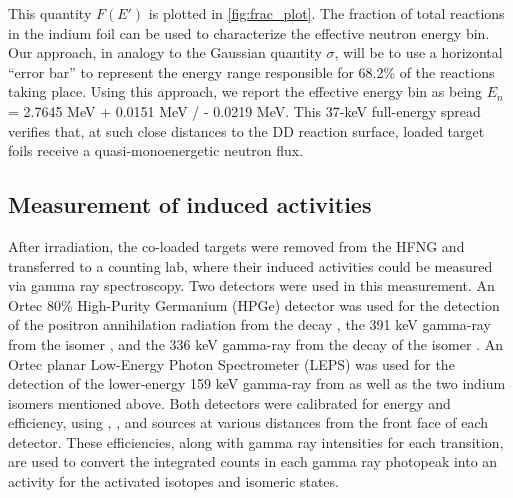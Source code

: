 \documentclass[5p]{elsarticle}
\newcommand{\pp}[1]{\left( #1\right)}
\newcommand{\comment}[1]{\todo[color=blue!20!white,inline]{ASV: #1}}
\begin{document}


This quantity $F\pp{E'}$ is plotted in \autoref{fig:frac_plot}. The fraction of total reactions in the indium foil can be used to characterize the effective neutron energy bin.  Our approach, in analogy to the Gaussian quantity $\sigma$, will be to use a horizontal \enquote{error bar}  to represent the energy range responsible for 68.2\% of the reactions taking place.  Using this approach, we report the effective energy bin as being $E_n$ = 2.7645 MeV + 0.0151 MeV / - 0.0219 MeV.  This 37-keV full-energy spread verifies that, at such close distances to the DD reaction surface, loaded target foils receive a quasi-monoenergetic neutron flux.









\subsection{Measurement of induced activities}\label{sec:spectroscopy}

After irradiation, the co-loaded targets were removed from the HFNG and transferred to a counting lab, where their induced activities could be measured via gamma ray spectroscopy. Two detectors were used in this measurement. An Ortec 80\% High-Purity Germanium (HPGe) detector was used for the detection of the positron annihilation radiation from the   decay \cite{Singh2007}, the 391 keV gamma-ray from the   isomer \cite{Blachot2010a}, and the 336 keV gamma-ray from the decay of the   isomer \cite{Blachot2012}. An Ortec planar Low-Energy Photon Spectrometer (LEPS)  was used for the detection of the lower-energy 159 keV gamma-ray from  \cite{Burrows2007} as well as the two indium isomers mentioned above. Both detectors were calibrated for energy and efficiency, using , , and  sources at various distances from the front face of each detector. These efficiencies, along with gamma ray intensities for each transition, are used to convert the integrated counts in each gamma ray photopeak into an activity for the activated isotopes and isomeric states. 
\end{document}
